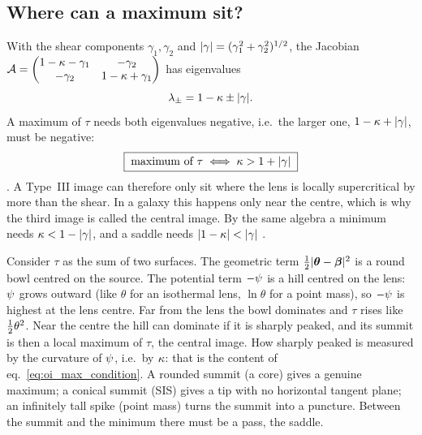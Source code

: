 \subsection{Where can a maximum sit?}

With the shear components $\gamma_1,\gamma_2$ and
$|\gamma|=(\gamma_1^2+\gamma_2^2)^{1/2}$, the Jacobian
$\mathcal{A}=\begin{pmatrix}1-\kappa-\gamma_1&-\gamma_2\\-\gamma_2&1-\kappa+\gamma_1\end{pmatrix}$
has eigenvalues
\begin{equation}
    \lambda_\pm = 1-\kappa \pm |\gamma| .
    \label{eq:oi_eigen}
\end{equation}
A maximum of $\tau$ needs both eigenvalues negative, i.e.\ the larger
one, $1-\kappa+|\gamma|$, must be negative:
\begin{equation}
    \boxed{\;\text{maximum of }\tau \;\Longleftrightarrow\; \kappa > 1 + |\gamma| \;}
    \label{eq:oi_max_condition}
\end{equation}
.  A Type~III image can therefore only sit where the
lens is locally supercritical by more than the shear.  In a
galaxy this happens only near the centre, which is why the third image
is called the central image.  By the same algebra a minimum needs
$\kappa<1-|\gamma|$, and a saddle needs $|1-\kappab|<|\gammaL|$
.

\begin{annotation}
Consider $\tau$ as the sum of two surfaces.  The geometric term
$\tfrac{1}{2}|\boldsymbol{\theta}-\boldsymbol{\beta}|^2$ is a round bowl centred on the source.
The potential term $-\psi$ is a hill centred on the lens: $\psi$ grows
outward (like $\theta$ for an isothermal lens, $\ln\theta$ for a point
mass), so $-\psi$ is highest at the lens centre.  Far from the lens the
bowl dominates and $\tau$ rises like $\tfrac{1}{2}\theta^2$.  Near the centre the
hill can dominate if it is sharply peaked, and its summit is then a
local maximum of $\tau$, the central image.  How sharply peaked is
measured by the curvature of $\psi$, i.e.\ by $\kappa$: that is the
content of eq.~\eqref{eq:oi_max_condition}.  A rounded summit (a core)
gives a genuine maximum; a conical summit (SIS) gives a tip with no
horizontal tangent plane; an infinitely tall spike (point mass) turns
the summit into a puncture.  Between the summit and the minimum there
must be a pass, the saddle.
\end{annotation}

